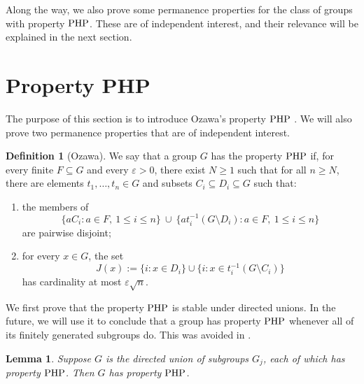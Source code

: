 \documentclass[11pt]{article}
\newtheorem{lem}[thm]{Lemma}
\theoremstyle{definition}
\newtheorem{defn}[thm]{Definition}
\theoremstyle{remark}
\numberwithin{equation}{section}
\numberwithin{equation}{section}
\numberwithin{equation}{section}
\begin{document}
Along the way, we also prove some permanence properties for the class of groups with property $\rm PHP$. These are of independent interest, and their relevance will be explained in the next section.







\section{Property {\rm PHP}}

The purpose of this section is to introduce Ozawa's property ${\rm {PHP}}$ \cite{Oz25}. We will also prove two permanence properties that are of independent interest.

\begin{defn}[Ozawa]\label{thedef}
We say that a group $G$ has the property ${\rm {PHP}}$ if, for every finite $F\subseteq G$ and every $\varepsilon>0$, there exist $N\geq 1$ such that for all $n\geq N$, there are elements $t_1,\ldots,t_n\in G$ and subsets $C_i\subseteq D_i\subseteq G$ such that:
\begin{enumerate}
\item the members of
$$
\{aC_i:a\in F,\ 1\leq i\leq n\}
 \ \cup\
 \{at_i^{-1}( G\setminus D_i):a\in F,\ 1\leq i\leq n\}
$$
are pairwise disjoint;
\item
for every $x\in G$, the set
$$
 J(x):=\{i:x\in D_i\}
   \cup\{i:x\in t_i^{-1}( G\setminus C_i)\}
$$
has cardinality at most $\varepsilon\sqrt n$.
\end{enumerate}
\end{defn}

We first prove that the property ${\rm {PHP}}$ is stable under directed unions. In the future, we will use it to conclude that a group has property ${\rm {PHP}}$ whenever all of its finitely generated subgroups do. This was avoided in \cite[Proof of Theorem 1.4]{Vi26}.

\begin{lem}\label{directed}
Suppose $ G$ is the directed union of subgroups $ G_j$, each of which has property ${\rm {PHP}}$.  Then $ G$ has property ${\rm {PHP}}$.
\end{lem}
\end{document}
